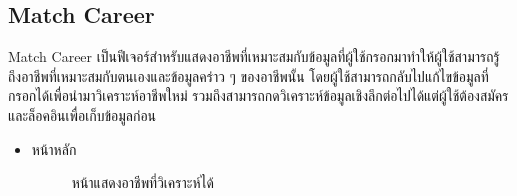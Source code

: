 \subsection {Match Career}
Match Career เป็นฟีเจอร์สำหรับแสดงอาชีพที่เหมาะสมกับข้อมูลที่ผู้ใช้กรอกมาทำให้ผู้ใช้สามารถรู้ถึงอาชีพที่เหมาะสมกับตนเองและข้อมูลคร่าว ๆ ของอาชีพนั้น โดยผู้ใช้สามารถกลับไปแก้ไขข้อมูลที่กรอกได้เพื่อนำมาวิเคราะห์อาชีพใหม่ รวมถึงสามารถกดวิเคราะห์ข้อมูลเชิงลึกต่อไปได้แต่ผู้ใช้ต้องสมัครและล็อคอินเพื่อเก็บข้อมูลก่อน
\begin{itemize}
    \item หน้าหลัก
          \begin{figure}[H]\centering
              \setlength{\fboxrule}{0.2mm} %
              \setlength{\fboxsep}{0.5cm}
              \caption{\centering หน้าแสดงอาชีพที่วิเคราะห์ได้}\label{fig:wireframe2_1}
          \end{figure}
\end{itemize}

